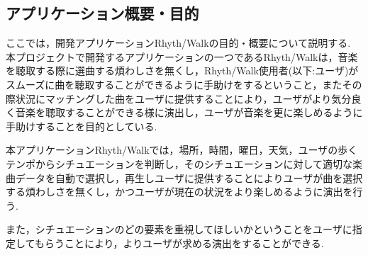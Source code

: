 \subsection{アプリケーション概要・目的}
\par
ここでは，開発アプリケーションRhyth/Walkの目的・概要について説明する.
本プロジェクトで開発するアプリケーションの一つであるRhyth/Walkは，音楽を聴取する際に選曲する煩わしさを無くし，Rhyth/Walk使用者(以下:ユーザ)がスムーズに曲を聴取することができるように手助けをするということ，またその際状況にマッチングした曲をユーザに提供することにより，ユーザがより気分良く音楽を聴取することができる様に演出し，ユーザが音楽を更に楽しめるように手助けすることを目的としている.
\par
本アプリケーションRhyth/Walkでは，場所，時間，曜日，天気，ユーザの歩くテンポからシチュエーションを判断し，そのシチュエーションに対して適切な楽曲データを自動で選択し，再生しユーザに提供することによりユーザが曲を選択する煩わしさを無くし，かつユーザが現在の状況をより楽しめるように演出を行う.
\par
また，シチュエーションのどの要素を重視してほしいかということをユーザに指定してもらうことにより，よりユーザが求める演出をすることができる.
